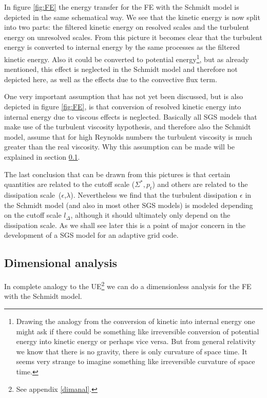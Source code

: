 In figure \ref{fig:FE} the energy transfer for the FE with the Schmidt model is
depicted in the same schematical way. We see that the kinetic energy is now
split into two parts:
the filtered kinetic energy on resolved scales and the turbulent energy on
unresolved scales. From this picture it becomes clear that the turbulent energy
is converted to internal energy by the same processes as the filtered kinetic
energy. Also it could be converted to potential energy\footnote{Drawing the
analogy from the conversion of kinetic into internal energy one might ask if
there could be something like irreversible conversion of potential energy into
kinetic energy or perhaps vice versa. But from general relativity we know that
there is no gravity, there is only curvature of space time. It seems very
strange to imagine something like irreversible curvature of space time.}, but as
already
mentioned, this effect is neglected in the Schmidt model and therefore not
depicted here, as well as the effects due to the convective flux term. 

One very important assumption that has not yet been discussed, but is also
depicted in figure \ref{fig:FE}, is that conversion of resolved kinetic energy
into internal energy due to viscous effects is neglected. Basically all SGS
models that make use of the turbulent viscosity hypothesis, and therefore also
the Schmidt model, assume that for high Reynolds numbers the turbulent viscosity
is much greater than the real viscosity. Why this assumption can be made will
be explained in section \ref{dimanalsgs}.

The last conclusion that can be drawn from this pictures is that certain
quantities are related to the cutoff scale ($\Sigma^*,p_t$) and others are
related to the dissipation scale~($\epsilon$,$\lambda$). Nevertheless we find
that the turbulent dissipation $\epsilon$ in the Schmidt model (and also in most
other SGS models) is modeled depending on the cutoff scale $l_{\Delta}$,
although it should ultimately only depend on the dissipation scale. As we shall
see later this is a point of major concern in the development of a SGS
model for an adaptive grid code.
\subsection{Dimensional analysis}\label{dimanalsgs}
In complete analogy to the UE\footnote{See appendix \ref{dimanal}.} we can do a
dimensionless analysis for the FE with the Schmidt model. 
